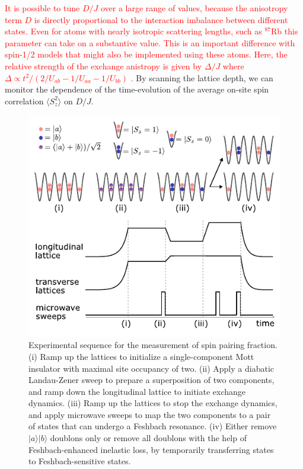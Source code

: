 \documentclass[aps,prl,twocolumn,superscriptaddress]{revtex4-1}
\newcommand{\newmat}[1]{\textcolor{red}{#1}}
\begin{document}
\newmat{It is possible to tune $D/J$ over a large range of values, because the anisotropy term $D$ is directly proportional to the interaction imbalance between different states. Even for atoms with nearly isotropic scattering lengths, such as $^{87}$Rb this parameter can take on a substantive value. This is an important difference with spin-1/2 models that might also be implemented using these atoms. Here, the relative strength of the exchange anistropy is given by $\Delta/J$ where $\Delta \propto t^2 / (2/U_{ab}-1/U_{aa}-1/U_{bb})$ \cite{Hild2014}.} By scanning the lattice depth, we can monitor the dependence of the time-evolution of the average on-site spin correlation $\langle S_z^2\rangle$ on $D/J$.

\begin{figure}
\centering
\includegraphics[width=\columnwidth]{figs/Figure_1_v3.pdf}
\caption{Experimental sequence for the measurement of spin pairing fraction. (i) Ramp up the lattices to initialize a single-component Mott insulator with maximal site occupancy of two. (ii) Apply a diabatic Landau-Zener sweep to prepare a superposition of two components, and ramp down the longitudinal lattice to initiate exchange dynamics. (iii) Ramp up the lattices to stop the exchange dynamics, and apply microwave sweeps to map the two components to a pair of states that can undergo a Feshbach resonance. (iv) Either remove $|a\rangle |b\rangle$ doublons only or remove all doublons with the help of Feshbach-enhanced inelastic loss, by temporarily transferring states to Feshbach-sensitive states.}
\label{fig:exp_procedure}
\end{figure}
\end{document}
